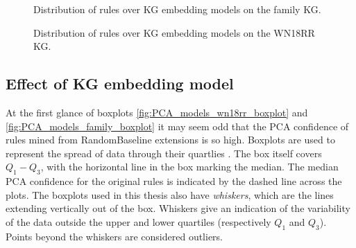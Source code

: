 \begin{figure}
\centering
    \centering
    
    \caption[Rules and their types over KG embedding models - family KG]{Distribution of rules over KG embedding models on the family KG.}
    \label{rule_dist_models_hbar_family}
\end{figure}

\begin{figure}
\centering
    \centering
    
    \caption[Rules and their types over KG embedding models - WN18RR KG]{Distribution of rules over KG embedding models on the WN18RR KG.}
    \label{rule_dist_models_hbar_wn18rr}
\end{figure}


\subsection{Effect of KG embedding model}
At the first glance of boxplots \ref{fig:PCA_models_wn18rr_boxplot} and \ref{fig:PCA_models_family_boxplot} it may seem odd that the PCA confidence of rules mined from RandomBaseline extensions is so high. Boxplots are used to represent the spread of data through their quartlies \cite{dutoit2012graphical}. The box itself covers $Q_1-Q_3$, with the horizontal line in the box marking the median. The median PCA confidence for the original rules is indicated by the dashed line across the plots. The boxplots used in this thesis also have \textit{whiskers}, which are the lines extending vertically out of the box. Whiskers give an indication of the variability of the data outside the upper and lower quartiles (respectively $Q_1$ and $Q_3$). Points beyond the whiskers are considered outliers.

